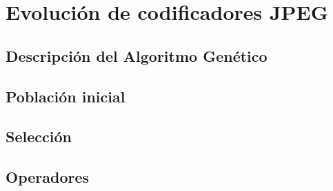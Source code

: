 
\chapter{Evolución de codificadores JPEG}\label{ch:evolucion}

\section{Descripción del Algoritmo Genético}

\section{Población inicial}

\section{Selección}

\section{Operadores}
